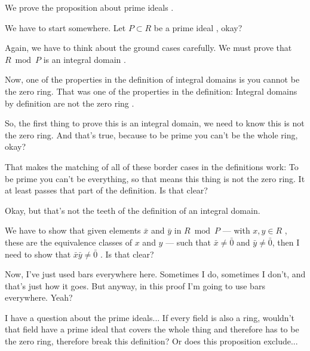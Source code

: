 \begin{speech}[00:54:41 - 00:56:19]
We prove the proposition about prime ideals .

We have to start somewhere. Let $P \subset R$ be a prime ideal , okay?

Again, we have to think about the ground cases carefully. We must prove that $R \bmod P$ is an integral domain .

Now, one of the properties in the definition of integral domains is you cannot be the zero ring. That was one of the properties in the definition: Integral domains by definition are not the zero ring .

So, the first thing to prove this is an integral domain, we need to know this is not the zero ring. And that's true, because to be prime you can't be the whole ring, okay?

That makes the matching of all of these border cases in the definitions work: To be prime you can't be everything, so that means this thing is not the zero ring. It at least passes that part of the definition. Is that clear?

Okay, but that's not the teeth of the definition of an integral domain.
\end{speech}

\begin{speech}[00:56:19 - 00:57:18]
We have to show that given elements $\bar{x}$ and $\bar{y}$ in $R \bmod P$  --- with $x, y \in R$ , these are the equivalence classes of $x$ and $y$ --- such that $\bar{x} \neq \bar{0}$ and $\bar{y} \neq \bar{0}$, then I need to show that $\bar{x}\bar{y} \neq \bar{0}$ . Is that clear?

Now, I've just used bars everywhere here. Sometimes I do, sometimes I don't, and that's just how it goes. But anyway, in this proof I'm going to use bars everywhere. Yeah?
\end{speech}

\begin{student}
I have a question about the prime ideals... If every field is also a ring, wouldn't that field have a prime ideal that covers the whole thing and therefore has to be the zero ring, therefore break this definition? Or does this proposition exclude...
\end{student}

